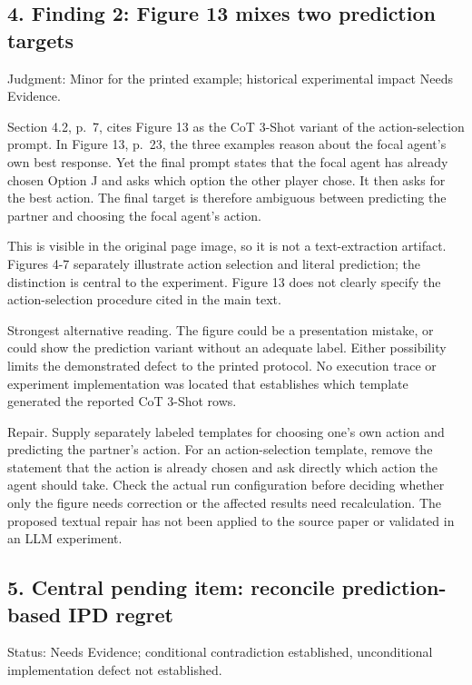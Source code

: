 \documentclass[10pt]{article}
\begin{document}
\subsection*{4. Finding 2: Figure 13 mixes two prediction targets}
Judgment: Minor for the printed example; historical experimental impact Needs Evidence.\par
Section 4.2, p. 7, cites Figure 13 as the CoT 3-Shot variant of the action-selection prompt. In Figure 13, p. 23, the three examples reason about the focal agent’s own best response. Yet the final prompt states that the focal agent has already chosen Option J and asks which option the other player chose. It then asks for the best action. The final target is therefore ambiguous between predicting the partner and choosing the focal agent’s action.\par
This is visible in the original page image, so it is not a text-extraction artifact. Figures 4-7 separately illustrate action selection and literal prediction; the distinction is central to the experiment. Figure 13 does not clearly specify the action-selection procedure cited in the main text.\par
Strongest alternative reading. The figure could be a presentation mistake, or could show the prediction variant without an adequate label. Either possibility limits the demonstrated defect to the printed protocol. No execution trace or experiment implementation was located that establishes which template generated the reported CoT 3-Shot rows.\par
Repair. Supply separately labeled templates for choosing one’s own action and predicting the partner’s action. For an action-selection template, remove the statement that the action is already chosen and ask directly which action the agent should take. Check the actual run configuration before deciding whether only the figure needs correction or the affected results need recalculation. The proposed textual repair has not been applied to the source paper or validated in an LLM experiment.\par
\subsection*{5. Central pending item: reconcile prediction-based IPD regret}
Status: Needs Evidence; conditional contradiction established, unconditional implementation defect not established.\par
\end{document}

